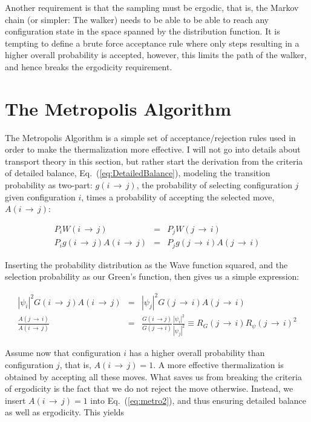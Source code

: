 Another requirement is that the sampling must be ergodic, that is, the Markov chain (or simpler: The walker) needs to be able to be able to reach any configuration state in the space spanned by the distribution function. It is tempting to define a brute force acceptance rule where only steps resulting in a higher overall probability is accepted, however, this limits the path of the walker, and hence breaks the ergodicity requirement.

\section{The Metropolis Algorithm}
\label{sec:MetroMain}

The Metropolis Algorithm is a simple set of acceptance/rejection rules used in order to make the thermalization more effective. I will not go into details about transport theory in this section, but rather start the derivation from the criteria of detailed balance, Eq.~(\ref{eq:DetailedBalance}), modeling the transition probability as two-part: $g(i\,\rightarrow\,j)$, the probability of selecting configuration $j$ given configuration $i$, times a probability of accepting the selected move, $A(i\,\rightarrow\,j)$:

\begin{eqnarray}
 \label{eq:metro1}
 P_iW(i\,\rightarrow\,j) &=& P_jW(j\,\rightarrow\,i) \nonumber \\
 P_ig(i\,\rightarrow\,j)A(i\,\rightarrow\,j) &=& P_jg(j\,\rightarrow\,i)A(j\,\rightarrow\,i)
\end{eqnarray}

Inserting the probability distribution as the Wave function squared, and the selection probability as our Green's function, then gives us a simple expression:

\begin{eqnarray}
  \label{eq:metro2}
  |\psi_i|^2G(i\,\rightarrow\,j)A(i\,\rightarrow\,j) &=& |\psi_j|^2G(j\,\rightarrow\,i)A(j\,\rightarrow\,i) \nonumber \\
  \frac{A(j\,\rightarrow\,i)}{A(i\,\rightarrow\,j)} &=& \frac{G(i\,\rightarrow j)}{G(j\,\rightarrow i)}\frac{|\psi_i|^2}{|\psi_j|^2} \equiv R_G(j\,\rightarrow\,i)R_\psi(j\,\rightarrow\,i)^2
\end{eqnarray}

Assume now that configuration $i$ has a higher overall probability than configuration $j$, that is, $A(i\,\rightarrow\,j) = 1$. A more effective thermalization is obtained by accepting all these moves. What saves us from breaking the criteria of ergodicity is the fact that we do not reject the move otherwise. Instead, we insert $A(i\,\rightarrow\,j) = 1$ into Eq.~(\ref{eq:metro2}), and thus ensuring detailed balance as well as ergodicity. This yields

